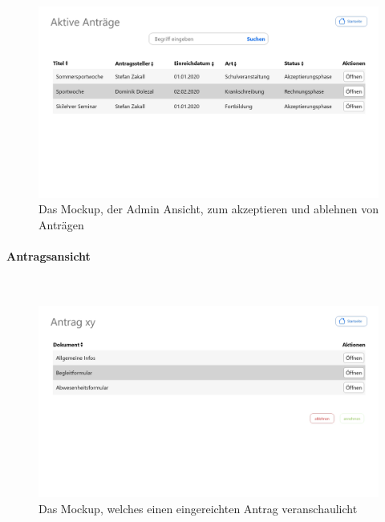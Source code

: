 \begin{figure}[H]
	\centering
	\includegraphics[width=1\linewidth]{images/Mockup-Admin}
	\caption[Mockup Adminansicht]{Das Mockup, der Admin Ansicht, zum akzeptieren und ablehnen von Anträgen}
	\label{fig:mockupAdmin}
\end{figure}
\paragraph{Antragsansicht}
~\\

\begin{figure}[H]
	\centering
	\includegraphics[width=1\linewidth]{images/Mockup-Antragsansicht}
	\caption[Mockup Antragsansicht]{Das Mockup, welches einen eingereichten Antrag veranschaulicht}
	\label{fig:mockupAntrag}
\end{figure}